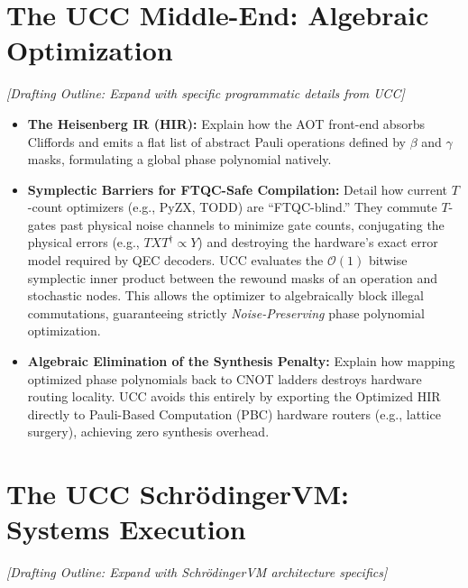 \documentclass[aps,prx,reprint,superscriptaddress,nofootinbib]{revtex4-2}
\theoremstyle{definition}
\newcommand{\svm}{Schr\"odingerVM}
\begin{document}
\section{The UCC Middle-End: Algebraic Optimization}
\label{sec:compiler}

\textit{[Drafting Outline: Expand with specific programmatic details from UCC]}

\begin{itemize}[leftmargin=*]
    \item \textbf{The Heisenberg IR (HIR):} Explain how the AOT front-end absorbs Cliffords and emits a flat list of abstract Pauli operations defined by $\beta$ and $\gamma$ masks, formulating a global phase polynomial natively.
    \item \textbf{Symplectic Barriers for FTQC-Safe Compilation:} Detail how current $T$-count optimizers (e.g., PyZX, TODD) are ``FTQC-blind.'' They commute $T$-gates past physical noise channels to minimize gate counts, conjugating the physical errors (e.g., $TXT^\dagger \propto Y$) and destroying the hardware's exact error model required by QEC decoders. UCC evaluates the $\mathcal{O}(1)$ bitwise symplectic inner product between the rewound masks of an operation and stochastic nodes. This allows the optimizer to algebraically block illegal commutations, guaranteeing strictly \textit{Noise-Preserving} phase polynomial optimization.
    \item \textbf{Algebraic Elimination of the Synthesis Penalty:} Explain how mapping optimized phase polynomials back to CNOT ladders destroys hardware routing locality. UCC avoids this entirely by exporting the Optimized HIR directly to Pauli-Based Computation (PBC) hardware routers (e.g., lattice surgery), achieving zero synthesis overhead.
\end{itemize}

\section{The UCC \svm{}: Systems Execution}
\label{sec:systems}

\textit{[Drafting Outline: Expand with \svm{} architecture specifics]}
\end{document}
